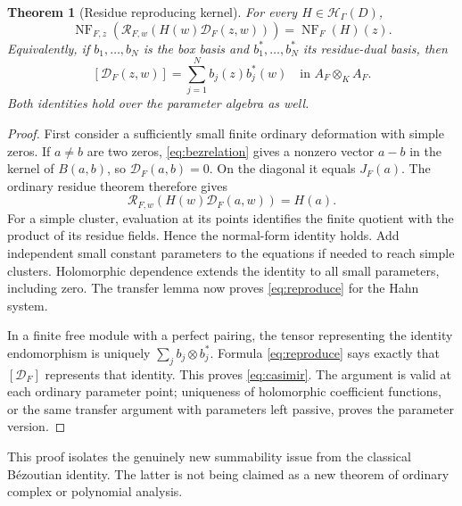 \documentclass[11pt,letterpaper]{article}
\newtheorem{theorem}{Theorem}[section]
\theoremstyle{definition}
\theoremstyle{remark}
\newcommand{\HH}{\mathcal H}
\newcommand{\RR}{\mathscr R}
\newcommand{\NF}{\operatorname{NF}}
\numberwithin{equation}{section}
\begin{document}
\begin{theorem}[Residue reproducing kernel]\label{thm:bezout}
For every $H\in\HH_\Gamma(D)$,
\begin{equation}\label{eq:reproduce}
 \NF_{F,z}\!\left(\RR_{F,w}
       (H(w)\mathcal D_F(z,w))\right)=\NF_F(H)(z).
\end{equation}
Equivalently, if $b_1,\ldots,b_N$ is the box basis and $b_1^*,\ldots,b_N^*$ its residue-dual basis, then
\begin{equation}\label{eq:casimir}
 [\mathcal D_F(z,w)]=\sum_{j=1}^N b_j(z)b_j^*(w)
       \quad\text{in }A_F\otimes_K A_F.
\end{equation}
Both identities hold over the parameter algebra as well.
\end{theorem}
\begin{proof}
First consider a sufficiently small finite ordinary deformation with simple zeros. If $a\ne b$ are two zeros, \eqref{eq:bezrelation} gives a nonzero vector $a-b$ in the kernel of $B(a,b)$, so $\mathcal D_F(a,b)=0$. On the diagonal it equals $J_F(a)$. The ordinary residue theorem therefore gives
\[
 \RR_{F,w}(H(w)\mathcal D_F(a,w))=H(a).
\]
For a simple cluster, evaluation at its points identifies the finite quotient with the product of its residue fields. Hence the normal-form identity holds. Add independent small constant parameters to the equations if needed to reach simple clusters. Holomorphic dependence extends the identity to all small parameters, including zero. The transfer lemma now proves \eqref{eq:reproduce} for the Hahn system.

In a finite free module with a perfect pairing, the tensor representing the identity endomorphism is uniquely $\sum_j b_j\otimes b_j^*$. Formula \eqref{eq:reproduce} says exactly that $[\mathcal D_F]$ represents that identity. This proves \eqref{eq:casimir}. The argument is valid at each ordinary parameter point; uniqueness of holomorphic coefficient functions, or the same transfer argument with parameters left passive, proves the parameter version.
\end{proof}

This proof isolates the genuinely new summability issue from the classical B\'ezoutian identity. The latter is not being claimed as a new theorem of ordinary complex or polynomial analysis.
\end{document}
